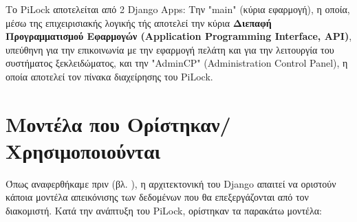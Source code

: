 	Το PiLock αποτελείται από 2 Django Apps: Την "main" (κύρια εφαρμογή), η οποία, μέσω της επιχειρισιακής λογικής τής αποτελεί την κύρια \textbf{Διεπαφή Προγραμματισμού Εφαρμογών (Application Programming Interface, API)}, υπεύθηνη για την επικοινωνία με την εφαρμογή πελάτη και για την λειτουργία του συστήματος ξεκλειδώματος, και την "AdminCP" (Administration Control Panel), η οποία αποτελεί τον πίνακα διαχείρησης του PiLock.

\section{Μοντέλα που Ορίστηκαν/Χρησιμοποιούνται}
	\label{sec:models}
	Όπως αναφερθήκαμε πριν (βλ. ), η αρχιτεκτονική του Django απαιτεί να οριστούν κάποια μοντέλα απεικόνισης των δεδομένων που θα επεξεργάζονται από τον διακομιστή. Κατά την ανάπτυξη του PiLock, ορίστηκαν τα παρακάτω μοντέλα:

